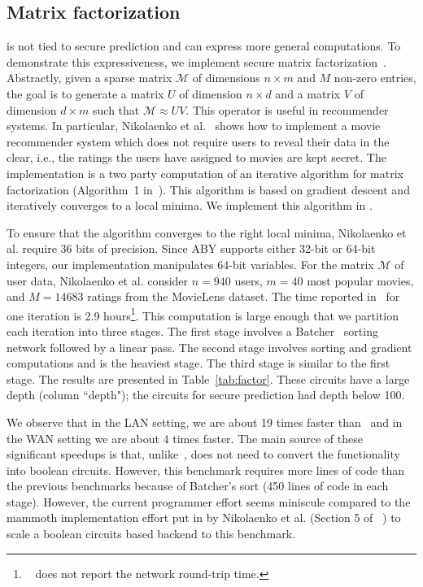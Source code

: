 \subsection{Matrix factorization}
\tool is not tied to secure prediction and can express more general computations.
To demonstrate this expressiveness, we  implement secure matrix factorization~\cite{valeriaMatrix}. Abstractly, given a sparse matrix $\mathcal{M}$ of dimensions
$n\times m$ and $M$ non-zero entries, the goal is to generate a matrix $U$ of dimension $n\times d$ and a matrix
$V$ of dimension $d\times m$ such that $\mathcal{M}\approx UV$. This operator is useful in recommender systems.
In particular, Nikolaenko et al.~\cite{valeriaMatrix} shows how to implement a movie recommender system which does not require users to reveal their data in the clear, i.e., the ratings the users have assigned to movies are kept secret. The implementation is a two party computation of an iterative algorithm for matrix factorization (Algorithm~1 in~\cite{valeriaMatrix}).
This algorithm is based on gradient descent and iteratively converges to a local minima.
We implement this algorithm in \tool.
  
To ensure that the algorithm converges to the right local minima, Nikolaenko et al. require
36 bits of precision. Since ABY supports either 32-bit or 64-bit integers, our \tool implementation
manipulates 64-bit variables. For the matrix $\mathcal{M}$ of  user data, Nikolaenko et al. consider $n=940$ users, $m=40$ most popular movies, and $M=14683$ ratings from the MovieLens dataset. The time reported in~\cite{valeriaMatrix}
for one iteration is 2.9 hours\footnote{~\cite{valeriaMatrix} does not report the network round-trip time.}. This computation is large enough that we partition each iteration
into three stages. The first stage involves a Batcher~\cite{Batcher} sorting network followed by a linear pass.
The second stage involves sorting and gradient computations and is the heaviest stage.
The third  stage is similar to the first stage. The results are presented in Table~\ref{tab:factor}. These circuits have a large depth (column ``depth"); the circuits for secure prediction had depth below 100.


We observe that in the LAN setting, we are about 19 times faster than~\cite{valeriaMatrix} and in the WAN
setting we are about 4 times faster. The main source of these significant speedups is that, unlike~\cite{valeriaMatrix}, \tool does not need to convert the functionality into boolean circuits. 
However, this benchmark requires more lines of code than the previous benchmarks
because of  Batcher's sort (450 lines of \tool code in each stage).
However, the current programmer effort seems miniscule compared to the mammoth implementation effort
put in by Nikolaenko et al. (Section 5 of ~\cite{valeriaMatrix}) to scale a boolean circuits based
backend to this benchmark.


